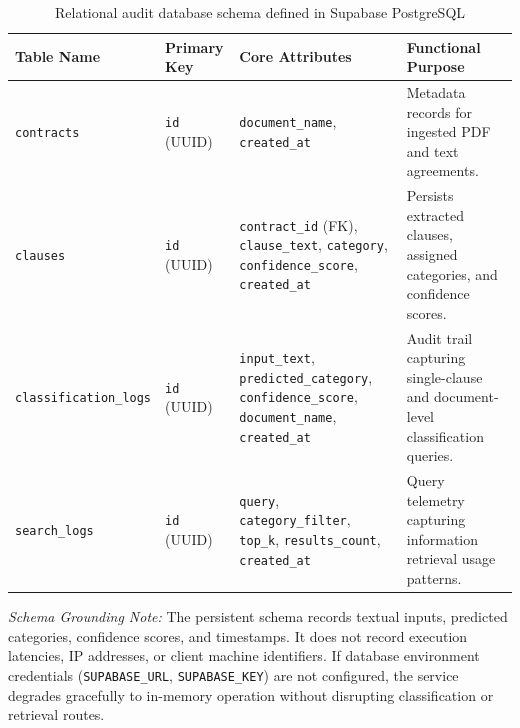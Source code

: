 \begin{table}[htbp]
\centering
\footnotesize
\setlength{\tabcolsep}{3.5pt}
\begin{tabular}{>{\raggedright\arraybackslash}p{2.6cm} >{\raggedright\arraybackslash}p{2.0cm} >{\raggedright\arraybackslash}p{4.6cm} >{\raggedright\arraybackslash}p{5.0cm}}
\toprule
\textbf{Table Name} & \textbf{Primary Key} & \textbf{Core Attributes} & \textbf{Functional Purpose} \\
\midrule
\texttt{contracts} & \texttt{id} (UUID) & \texttt{document\_name}, \texttt{created\_at} & Metadata records for ingested PDF and text agreements. \\
\addlinespace
\texttt{clauses} & \texttt{id} (UUID) & \texttt{contract\_id} (FK), \texttt{clause\_text}, \texttt{category}, \texttt{confidence\_score}, \texttt{created\_at} & Persists extracted clauses, assigned categories, and confidence scores. \\
\addlinespace
\texttt{classification\_logs} & \texttt{id} (UUID) & \texttt{input\_text}, \texttt{predicted\_category}, \texttt{confidence\_score}, \texttt{document\_name}, \texttt{created\_at} & Audit trail capturing single-clause and document-level classification queries. \\
\addlinespace
\texttt{search\_logs} & \texttt{id} (UUID) & \texttt{query}, \texttt{category\_filter}, \texttt{top\_k}, \texttt{results\_count}, \texttt{created\_at} & Query telemetry capturing information retrieval usage patterns. \\
\bottomrule
\end{tabular}
\caption{Relational audit database schema defined in Supabase PostgreSQL}\label{tab:database_schema}
\end{table}

\textit{Schema Grounding Note:} The persistent schema records textual inputs, predicted categories, confidence scores, and timestamps. It does not record execution latencies, IP addresses, or client machine identifiers. If database environment credentials (\texttt{SUPABASE\_URL}, \texttt{SUPABASE\_KEY}) are not configured, the service degrades gracefully to in-memory operation without disrupting classification or retrieval routes.


